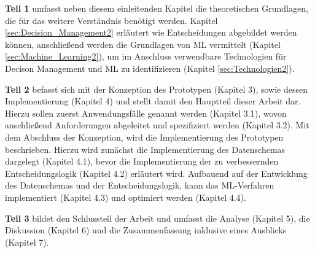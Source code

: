 \textbf{Teil 1} umfasst neben diesem einleitenden Kapitel die theoretischen Grundlagen, die für das weitere Verständnis benötigt werden. Kapitel \ref{sec:Decision_Management2} erläutert wie Entscheidungen abgebildet werden können, anschließend werden die Grundlagen von ML vermittelt (Kapitel \ref{sec:Machine_Learning2}), um im Anschluss verwendbare Technologien für Decison Management und ML zu identifizieren (Kapitel \ref{sec:Technologien2}).  

\textbf{Teil 2} befasst sich mit der Konzeption des Prototypen (Kapitel 3), sowie dessen Implementierung (Kapitel 4) und stellt damit den Hauptteil dieser Arbeit dar. Hierzu sollen zuerst Anwendungsfälle genannt werden (Kapitel 3.1), wovon anschließend Anforderungen abgeleitet und spezifiziert werden (Kapitel 3.2). Mit dem Abschluss der Konzeption, wird die Implementierung des Prototypen beschrieben. Hierzu wird zunächst die Implementierung des Datenschemas dargelegt (Kapitel 4.1), bevor die Implementierung der zu verbessernden Entscheidungslogik (Kapitel 4.2) erläutert wird. Aufbauend auf der Entwicklung des Datenschemas und der Entscheidungslogik, kann das ML-Verfahren implementiert (Kapitel 4.3) und optimiert werden (Kapitel 4.4).        

\textbf{Teil 3} bildet den Schlussteil der Arbeit und umfasst die Analyse (Kapitel 5), die Diskussion (Kapitel 6) und die Zusammenfassung inklusive eines Ausblicks (Kapitel 7).

